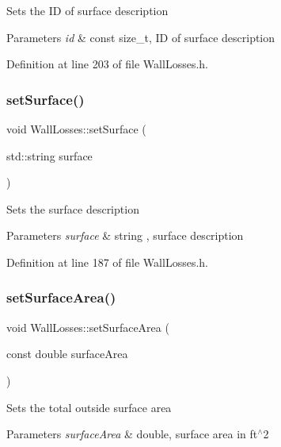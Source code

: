 Sets the ID of surface description 
\begin{DoxyParams}{Parameters}
{\em id} & const size\+\_\+t, ID of surface description \\
\hline
\end{DoxyParams}


Definition at line 203 of file Wall\+Losses.\+h.

\mbox{\label{class_wall_losses_af329a27b78e1f2d84af6a48ffc59bfad}} 
\subsubsection{\texorpdfstring{set\+Surface()}{setSurface()}}
{\footnotesize\ttfamily void Wall\+Losses\+::set\+Surface (\begin{DoxyParamCaption}\item[{std\+::string}]{surface }\end{DoxyParamCaption})\hspace{0.3cm}{\ttfamily [inline]}}

Sets the surface description 
\begin{DoxyParams}{Parameters}
{\em surface} & string , surface description \\
\hline
\end{DoxyParams}


Definition at line 187 of file Wall\+Losses.\+h.

\mbox{\label{class_wall_losses_acbbbe4b1ec44bb04e5e1db944017995c}} 
\subsubsection{\texorpdfstring{set\+Surface\+Area()}{setSurfaceArea()}}
{\footnotesize\ttfamily void Wall\+Losses\+::set\+Surface\+Area (\begin{DoxyParamCaption}\item[{const double}]{surface\+Area }\end{DoxyParamCaption})\hspace{0.3cm}{\ttfamily [inline]}}

Sets the total outside surface area 
\begin{DoxyParams}{Parameters}
{\em surface\+Area} & double, surface area in ft$^\wedge$2 \\
\hline
\end{DoxyParams}


